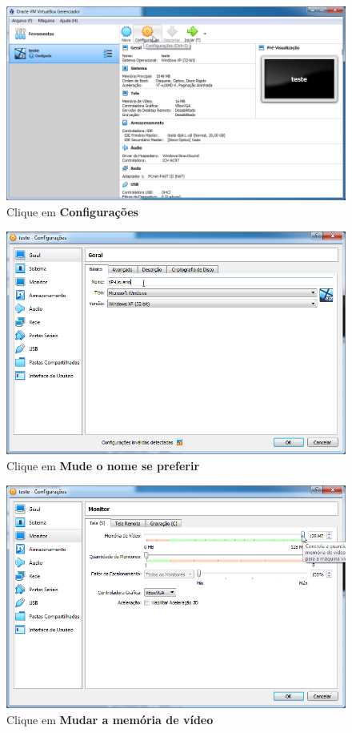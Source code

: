 \documentclass[10pt]{article}
\begin{document}
\begin{figure}[H]
    \centering
    \caption{Clique em \textbf{Configurações}}
    \label{fig:317}
    \includegraphics[width=\linewidth]{images/ativacao_das_maquinas_virtuais/configuracao_inicial_das_maquinas_virtuais/007.png}
\end{figure}
\begin{figure}[H]
    \centering
    \caption{Clique em \textbf{Mude o nome se preferir}}
    \label{fig:318}
    \includegraphics[width=\linewidth]{images/ativacao_das_maquinas_virtuais/configuracao_inicial_das_maquinas_virtuais/008.png}
\end{figure}
\begin{figure}[H]
    \centering
    \caption{Clique em \textbf{Mudar a memória de vídeo}}
    \label{fig:319}
    \includegraphics[width=\linewidth]{images/ativacao_das_maquinas_virtuais/configuracao_inicial_das_maquinas_virtuais/009.png}
\end{figure}
\end{document}
